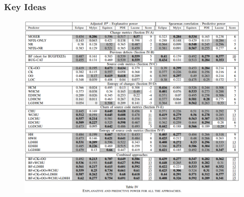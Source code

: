 \documentclass[conference]{IEEEtran}
\begin{document}
\subsubsection{\textbf{Key Ideas}}
\begin{figure}[!htbp]
    \centering
    \includegraphics[width=15cm]{results.png}
    \label{fig:B}
\end{figure}
\end{document}

